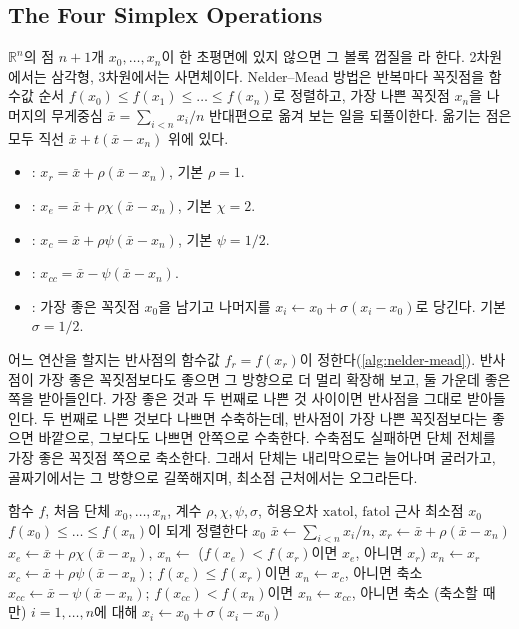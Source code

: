 \subsection{The Four Simplex Operations}

$\mathbb R^n$의 점 $n+1$개 $x_0,\dots,x_n$이 한 초평면에 있지 않으면 그 볼록 껍질을 라 한다. 2차원에서는 삼각형, 3차원에서는 사면체이다. Nelder--Mead 방법은 반복마다 꼭짓점을 함수값 순서 $f(x_0)\le f(x_1)\le\dots\le f(x_n)$로 정렬하고, 가장 나쁜 꼭짓점 $x_n$을 나머지의 무게중심 $\bar x=\sum_{i<n}x_i/n$ 반대편으로 옮겨 보는 일을 되풀이한다. 옮기는 점은 모두 직선 $\bar x+t(\bar x-x_n)$ 위에 있다.
\begin{itemize}
\item {}: $x_r=\bar x+\rho(\bar x-x_n)$, 기본 $\rho=1$.
\item {}: $x_e=\bar x+\rho\chi(\bar x-x_n)$, 기본 $\chi=2$.
\item {}: $x_c=\bar x+\rho\psi(\bar x-x_n)$, 기본 $\psi=1/2$.
\item {}: $x_{cc}=\bar x-\psi(\bar x-x_n)$.
\item {}: 가장 좋은 꼭짓점 $x_0$을 남기고 나머지를 $x_i\gets x_0+\sigma(x_i-x_0)$로 당긴다. 기본 $\sigma=1/2$.
\end{itemize}
어느 연산을 할지는 반사점의 함수값 $f_r=f(x_r)$이 정한다(\cref{alg:nelder-mead}). 반사점이 가장 좋은 꼭짓점보다도 좋으면 그 방향으로 더 멀리 확장해 보고, 둘 가운데 좋은 쪽을 받아들인다. 가장 좋은 것과 두 번째로 나쁜 것 사이이면 반사점을 그대로 받아들인다. 두 번째로 나쁜 것보다 나쁘면 수축하는데, 반사점이 가장 나쁜 꼭짓점보다는 좋으면 바깥으로, 그보다도 나쁘면 안쪽으로 수축한다. 수축점도 실패하면 단체 전체를 가장 좋은 꼭짓점 쪽으로 축소한다. 그래서 단체는 내리막으로는 늘어나며 굴러가고, 골짜기에서는 그 방향으로 길쭉해지며, 최소점 근처에서는 오그라든다.

\begin{algorithm}[t]
\begin{algorithmic}[1]
\Require 함수 $f$, 처음 단체 $x_0,\dots,x_n$, 계수 $\rho,\chi,\psi,\sigma$, 허용오차 $\mathrm{xatol}$, $\mathrm{fatol}$
\Ensure 근사 최소점 $x_0$
\Loop
  \State $f(x_0)\le\dots\le f(x_n)$이 되게 정렬한다
   \Return $x_0$ \EndIf
  \State $\bar x\gets\sum_{i<n}x_i/n$, $x_r\gets\bar x+\rho(\bar x-x_n)$
    \State $x_e\gets\bar x+\rho\chi(\bar x-x_n)$, $x_n\gets$ ($f(x_e)<f(x_r)$이면 $x_e$, 아니면 $x_r$)
    \State $x_n\gets x_r$
    \State $x_c\gets\bar x+\rho\psi(\bar x-x_n)$; $f(x_c)\le f(x_r)$이면 $x_n\gets x_c$, 아니면 축소
  \Else
    \State $x_{cc}\gets\bar x-\psi(\bar x-x_n)$; $f(x_{cc})<f(x_n)$이면 $x_n\gets x_{cc}$, 아니면 축소
  \EndIf
  \State (축소할 때만) $i=1,\dots,n$에 대해 $x_i\gets x_0+\sigma(x_i-x_0)$
\EndLoop
\end{algorithmic}
\caption{Nelder--Mead 방법(scipy의 순서)}
\label{alg:nelder-mead}
\end{algorithm}


